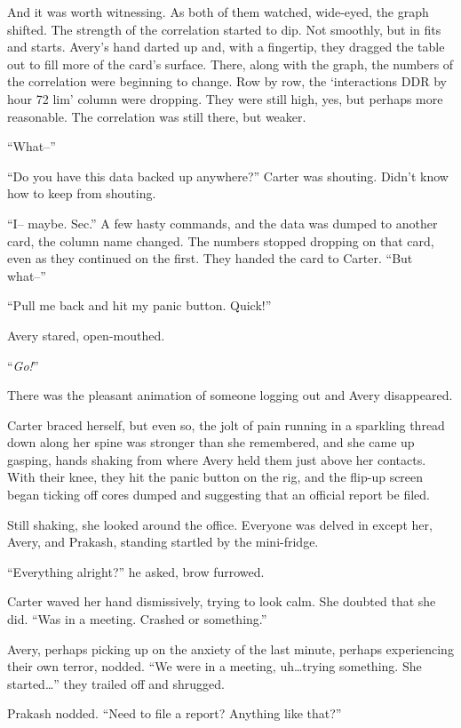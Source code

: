 And it was worth witnessing. As both of them watched, wide-eyed, the graph shifted. The strength of the correlation started to dip. Not smoothly, but in fits and starts. Avery's hand darted up and, with a fingertip, they dragged the table out to fill more of the card's surface. There, along with the graph, the numbers of the correlation were beginning to change. Row by row, the `interactions DDR by hour 72 lim' column were dropping. They were still high, yes, but perhaps more reasonable. The correlation was still there, but weaker.

``What--''

``Do you have this data backed up anywhere?'' Carter was shouting. Didn't know how to keep from shouting.

``I-- maybe. Sec.'' A few hasty commands, and the data was dumped to another card, the column name changed. The numbers stopped dropping on that card, even as they continued on the first. They handed the card to Carter. ``But what--''

``Pull me back and hit my panic button. Quick!''

Avery stared, open-mouthed.

``\emph{Go!}''

There was the pleasant animation of someone logging out and Avery disappeared.

Carter braced herself, but even so, the jolt of pain running in a sparkling thread down along her spine was stronger than she remembered, and she came up gasping, hands shaking from where Avery held them just above her contacts. With their knee, they hit the panic button on the rig, and the flip-up screen began ticking off cores dumped and suggesting that an official report be filed.

Still shaking, she looked around the office. Everyone was delved in except her, Avery, and Prakash, standing startled by the mini-fridge.

``Everything alright?'' he asked, brow furrowed.

Carter waved her hand dismissively, trying to look calm. She doubted that she did. ``Was in a meeting. Crashed or something.''

Avery, perhaps picking up on the anxiety of the last minute, perhaps experiencing their own terror, nodded. ``We were in a meeting, uh\ldots{}trying something. She started\ldots{}'' they trailed off and shrugged.

Prakash nodded. ``Need to file a report? Anything like that?''

